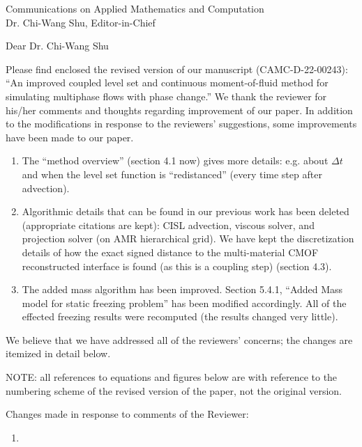 \documentclass{letter}
\date{\today}
\begin{document}
\begin{letter}{
Communications on Applied Mathematics and Computation  \\
Dr. Chi-Wang Shu, Editor-in-Chief\\}
	
\opening{Dear Dr. Chi-Wang Shu}
Please find enclosed the revised version of our 
manuscript (CAMC-D-22-00243):
``An improved coupled level set and continuous 
moment-of-fluid method for simulating multiphase flows 
with phase change.''
We thank the reviewer for his/her comments and thoughts 
regarding improvement of our paper. 
In addition to the modifications in response to the reviewers'
suggestions, some improvements have been made to our paper.
\begin{enumerate}
\item The ``method overview'' (section 4.1 now) gives more details: e.g. about
$\Delta t$ and when the level set function is ``redistanced'' (every time step
after advection).  
\item Algorithmic details that can be found in our previous work has been 
  deleted (appropriate citations are kept): CISL advection, viscous solver,
  and projection solver (on AMR hierarchical grid).  We have kept the 
  discretization details of how the exact signed distance to the multi-material
  CMOF reconstructed interface is found (as this is a coupling step) 
  (section 4.3).
\item The added mass algorithm has been improved.  Section 5.4.1, ``Added
  Mass model for static freezing problem'' has been modified accordingly.
  All of the effected freezing results were recomputed (the results changed
  very little).
\end{enumerate}	
We believe that we have addressed all of the reviewers'
concerns; the changes are itemized in detail below.\par 
\par\noindent
NOTE: all references to equations and figures below are with
reference to the numbering scheme of the revised version of the paper,
not the original version.  
\par\noindent
Changes made in response to comments of the Reviewer: \par 
\begin{enumerate}
\item 
\begin{verbatim}

\end{verbatim}
\end{enumerate}
\end{letter}
\end{document}
